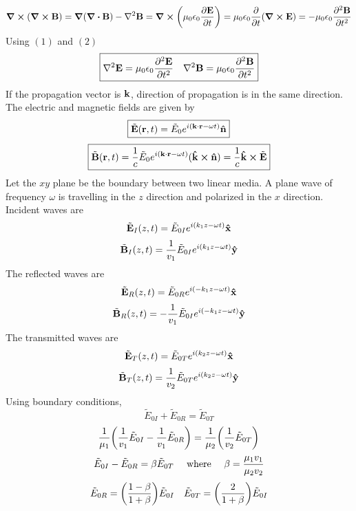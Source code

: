 \documentclass[12pt]{article}
\begin{document}
\[\curl{\qty(\curl{\vb{B}})}=\grad{\qty(\div{\vb{B}})}-\laplacian{\vb{B}}=\curl{\qty(\mu_0\epsilon_0\pdv{\vb{E}}{t})}=\mu_0\epsilon_0\pdv{t}\qty(\curl{\vb{E}})=-\mu_0\epsilon_0\pdv[2]{\vb{B}}{t}\]
Using $(1)$ and $(2)$ \\
\[\boxed{\laplacian{\vb{E}}=\mu_0\epsilon_0\pdv[2]{\vb{E}}{t}\quad\laplacian{\vb{B}}=\mu_0\epsilon_0\pdv[2]{\vb{B}}{t}}\]
If the propagation vector is $\vb{k}$, direction of propagation is in the same direction.
The electric and magnetic fields are given by
\[\boxed{\tilde{\vb{E}}(\vb{r},t)=\tilde{E}_0e^{i(\vb{k}\cdot\vb{r}-\omega t)}\vu{n}}\]
\[\boxed{\tilde{\vb{B}}(\vb{r},t)=\frac{1}{c}\tilde{E}_0e^{i(\vb{k}\cdot\vb{r}-\omega t)}(\vu{k}\cp\vu{n})=\frac{1}{c}\vu{k}\cp\tilde{\vb{E}}}\]
Let the $xy$ plane be the boundary between two linear media. A plane wave of frequency $\omega$ is travelling in the $z$ direction and polarized in the $x$ direction.\\
Incident waves are \[\tilde{\vb{E}}_I(z,t)=\tilde{E}_{0I}e^{i(k_1z-\omega t)}\vu{x}\]
\[\tilde{\vb{B}}_I(z,t)=\frac{1}{v_1}\tilde{E}_{0I}e^{i(k_1z-\omega t)}\vu{y}\]
The reflected waves are  \[\tilde{\vb{E}}_R(z,t)=\tilde{E}_{0R}e^{i(-k_1z-\omega t)}\vu{x}\]
\[\tilde{\vb{B}}_R(z,t)=-\frac{1}{v_1}\tilde{E}_{0I}e^{i(-k_1z-\omega t)}\vu{y}\]
The transmitted waves are  \[\tilde{\vb{E}}_T(z,t)=\tilde{E}_{0T}e^{i(k_2z-\omega t)}\vu{x}\]
\[\tilde{\vb{B}}_T(z,t)=\frac{1}{v_2}\tilde{E}_{0T}e^{i(k_2z-\omega t)}\vu{y}\]
Using boundary conditions,\\
\[\tilde{E}_{0I}+\tilde{E}_{0R}=\tilde{E}_{0T}\]
\[\frac{1}{\mu_1}\qty(\frac{1}{v_1}\tilde{E}_{0I}-\frac{1}{v_1}\tilde{E}_{0R})=\frac{1}{\mu_2}\qty(\frac{1}{v_2}\tilde{E}_{0T})\]
\[\tilde{E}_{0I}-\tilde{E}_{0R}=\beta\tilde{E}_{0T}\qq{ where }\beta=\frac{\mu_1v_1}{\mu_2v_2}\]
\[\tilde{E}_{0R}=\qty(\frac{1-\beta}{1+\beta})\tilde{E}_{0I}\quad\tilde{E}_{0T}=\qty(\frac{2}{1+\beta})\tilde{E}_{0I}\]
\end{document}
